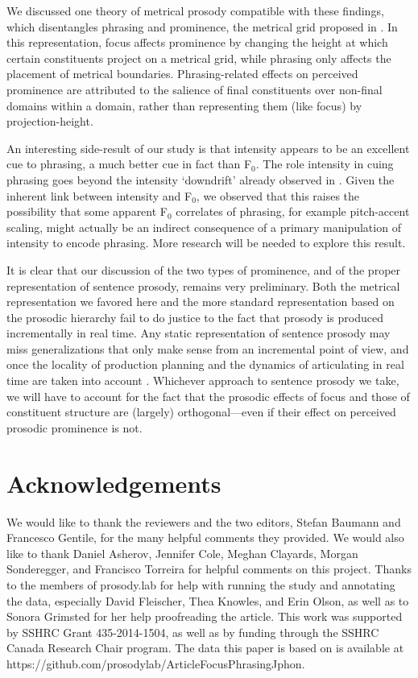 \documentclass[preprint,review,12pt,authoryear,times]{elsarticle}
\begin{document}
We discussed one theory of metrical prosody compatible with these findings, which disentangles phrasing and prominence, the metrical grid proposed in \citet{wagner05recursion}. In this representation, focus affects prominence by changing the height at which certain constituents project on a metrical grid, while phrasing only affects the placement of metrical boundaries. Phrasing-related effects on perceived prominence are attributed to the salience of final constituents over non-final domains within a domain, rather than representing them (like focus) by projection-height. 

An interesting side-result of our study is that intensity appears to be an excellent cue to phrasing, a much better cue in fact than F$_0$. The role intensity in cuing phrasing goes beyond the intensity `downdrift' already observed in \citet{pierr79}. Given the inherent link between intensity and F$_0$, we observed that this raises the possibility that some apparent F$_0$ correlates of phrasing, for example pitch-accent scaling, might actually be an indirect consequence of a primary manipulation of intensity to encode phrasing. More research will be needed to explore this result.

It is clear that our discussion of the two types of prominence, and of the proper representation of sentence prosody, remains very preliminary. Both the metrical representation we favored here and the more standard representation based on the prosodic hierarchy fail to do justice to the fact that prosody is produced incrementally in real time. Any static representation of sentence prosody may miss generalizations that only make sense from an incremental point of view, and once the locality of production planning \citep[cf.][]{keati02} and the dynamics of articulating in real time are taken into account \citep[cf.][]{mucke14}. Whichever approach to sentence prosody we take, we will have to account for the fact that the prosodic effects of focus and those of constituent structure are (largely) orthogonal---even if their effect on perceived prosodic prominence is not.


\section*{Acknowledgements}

We would like to thank the reviewers and the two editors, Stefan Baumann and Francesco Gentile, for the many helpful comments they provided. We  would also like to thank Daniel Asherov, Jennifer Cole, Meghan Clayards, Morgan Sonderegger, and Francisco Torreira for helpful comments on this project. Thanks to the members of prosody.lab for help with running the study and annotating the data, especially David Fleischer, Thea Knowles,  and Erin Olson, as well as to Sonora Grimsted for her help proofreading the article. This work was supported by SSHRC Grant 435-2014-1504, as well as by funding through the SSHRC Canada Research Chair program. The data this paper is based on is available at https://github.com/prosodylab/ArticleFocusPhrasingJphon.


\newpage


\end{document}
